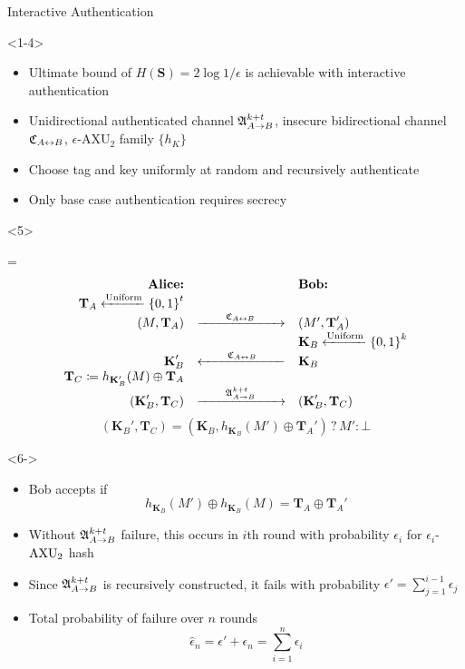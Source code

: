 \documentclass[xcolor=dvipsnames]{beamer}
\newcommand{\?}{\mathrel{?}} %
\newcommand{\rv}[1]{\boldsymbol{\mathbf{#1}}} %
\newenvironment{Array}[1] %
{\def\arraystretch{1.75}\everymath={\displaystyle}\[\begin{array}{#1}}
{\end{array}\]}
\newcommand{\AXU}{\mathrm{AXU}_{2}}
\newcommand{\eAXU}{\epsilon\text{-}\AXU}
\begin{document}
\begin{frame}{Interactive Authentication}
  \begin{onlyenv}<1-4>
    \begin{itemize}[<+->]
      \item Ultimate bound of \(H(\rv{S}) = 2 \log 1/\epsilon\) is achievable with interactive authentication
      \item Unidirectional authenticated channel \(\mathfrak{A}^{k+t}_{A \to B}\), insecure bidirectional channel \(\mathfrak{C}_{A \leftrightarrow B}\), \(\eAXU\) family \(\{h_K\}\)
      \item Choose tag and key uniformly at random and recursively authenticate
      \item Only base case authentication requires secrecy
    \end{itemize}
  \end{onlyenv}
  \begin{onlyenv}<5>

    \begin{Array}{rcl}
      \text{\textbf{Alice:}} & & \text{\textbf{Bob:}} \\
      \rv{T}_A \xleftarrow{\text{Uniform}} {\{0,1\}}^t & & \\
      (M, \rv{T}_A) & \xrightarrow{\qquad \insec \qquad} & (M', \rv{T}_A') \\
                    & & \rv{K}_B \xleftarrow{\text{Uniform}} {\{0,1\}}^k \\
      \rv{K}_B' & \xleftarrow{\qquad \insec \qquad} & \rv{K}_B \\
      \rv{T}_C \coloneqq h_{\rv{K}_B'}{(M)} \oplus \rv{T}_A & & \\
      (\rv{K}_B', \rv{T}_C) & \xrightarrow{\qquad \authkt \qquad} & (\rv{K}_B', \rv{T}_C) \\
    \end{Array}
    \[ (\rv{K}_B', \rv{T}_C) = (\rv{K}_B, h_{\rv{K}_B}{(M')} \oplus \rv{T}_A') \? M' : \bot \]
  \end{onlyenv}
  \begin{onlyenv}<6->
    \begin{itemize}[<+(1)->]
      \item Bob accepts if
        \[ h_{\rv{K}_B}(M') \oplus h_{\rv{K}_B}(M) = \rv{T}_A \oplus \rv{T}_A' \]
      \item Without \(\mathfrak{A}^{k+t}_{A \to B}\) failure, this occurs in \(i\)th round with probability \(\epsilon_i\) for \(\epsilon_i\)-\({\rm AXU_2}\) hash
      \item Since \(\mathfrak{A}^{k+t}_{A \to B}\) is recursively constructed, it fails with probability \( \epsilon' = \sum_{j=1}^{i-1} \epsilon_j \)
      \item Total probability of failure over \(n\) rounds
        \[ \hat{\epsilon}_n = \epsilon' + \epsilon_n = \sum_{i=1}^n \epsilon_i \]
    \end{itemize}
  \end{onlyenv}
\end{frame}
\end{document}
